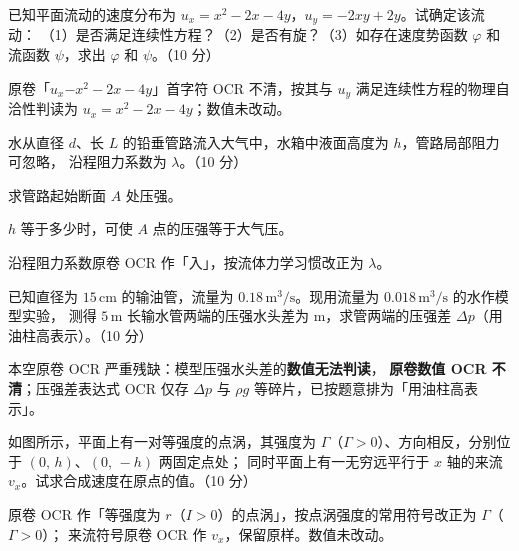 \begin{ti}
  \item 已知平面流动的速度分布为 $u_x=x^2-2x-4y$，$u_y=-2xy+2y$。试确定该流动：
  （1）是否满足连续性方程？（2）是否有旋？（3）如存在速度势函数 $\varphi$ 和流函数 $\psi$，求出 $\varphi$ 和 $\psi$。（10 分）\hfill{}
  \begin{tishi}原卷「$u_x\mathrm{-}x^2-2x-4y$」首字符 OCR 不清，按其与 $u_y$ 满足连续性方程的物理自洽性判读为 $u_x=x^2-2x-4y$；数值未改动。\end{tishi}

  \item 水从直径 $d$、长 $L$ 的铅垂管路流入大气中，水箱中液面高度为 $h$，管路局部阻力可忽略，
  沿程阻力系数为 $\lambda$。（10 分）\hfill{}
  \begin{xiaowen}
    \item 求管路起始断面 $A$ 处压强。
    \item $h$ 等于多少时，可使 $A$ 点的压强等于大气压。
  \end{xiaowen}
  \begin{tishi}沿程阻力系数原卷 OCR 作「入」，按流体力学习惯改正为 $\lambda$。\end{tishi}

  \item 已知直径为 $15\,\mathrm{cm}$ 的输油管，流量为 $0.18\,\mathrm{m^3/s}$。现用流量为 $0.018\,\mathrm{m^3/s}$ 的水作模型实验，
  测得 $5\,\mathrm{m}$ 长输水管两端的压强水头差为 \underline{\hspace{2.5cm}} $\mathrm{m}$，求管两端的压强差 $\Delta p$（用油柱高表示）。（10 分）\hfill{}
  \begin{tishi}本空原卷 OCR 严重残缺：模型压强水头差的\textbf{数值无法判读}，
  \textbf{原卷数值 OCR 不清}；压强差表达式 OCR 仅存 $\Delta p$ 与 $\rho g$ 等碎片，已按题意排为「用油柱高表示」。\end{tishi}

  \item 如图所示，平面上有一对等强度的点涡，其强度为 $\Gamma$（$\Gamma>0$）、方向相反，分别位于 $(0,\,h)$、$(0,\,-h)$ 两固定点处；
  同时平面上有一无穷远平行于 $x$ 轴的来流 $v_x$。试求合成速度在原点的值。（10 分）\hfill{}
  \begin{tishi}原卷 OCR 作「等强度为 $r$（$I>0$）的点涡」，按点涡强度的常用符号改正为 $\Gamma$（$\Gamma>0$）；
  来流符号原卷 OCR 作 $v_x$，保留原样。数值未改动。\end{tishi}


\end{ti}
